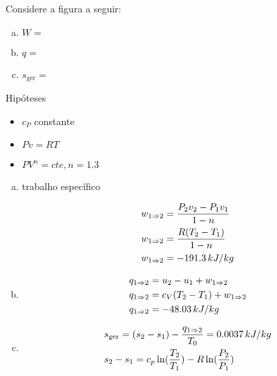 \begin{Exerc}[8.117 6\pa Ed.]
Considere a figura a seguir:


\begin{enumerate}[a)]
 \item $W =$
 \item $q =$
 \item $s_{\operatorname{ger}} =$
\end{enumerate}
\end{Exerc}

\begin{sol}
Hipóteses

\begin{itemize}
\item $c_{P}$ constante
\item $Pv = RT$
\item $PV^{n}=cte, n = 1.3$
\end{itemize}

\begin{enumerate}[a)]
 \item trabalho específico

\[
\begin{gathered}
  w_{1 \imp 2} = \frac{P_2 v_2 - P_1 v_1}{1-n} \hfill \\
  w_{1 \imp 2} = \frac{R(T_2 - T_1)}{1-n} \hfill \\
  w_{1 \imp 2} = -191.3\,kJ/kg \hfill \\
\end{gathered} 
\]

 \item

\[
\begin{gathered}
  q_{1 \imp 2} = u_2 - u_1 + w_{1 \imp 2} \hfill \\
  q_{1 \imp 2} = c_V (T_2 - T_1) + w_{1 \imp 2} \hfill \\ 
  q_{1 \imp 2} = -48.03\,kJ/kg \hfill \\ 
\end{gathered} 
\]

 \item

\[
\begin{gathered}
  s_{\operatorname{ger}} = (s_2 - s_1) - \frac{q _{1 \imp 2}}{T_0} = 0.0037\,kJ/kg \hfill \\
  s_2 - s_1 = c_p \ln(\frac{T_2}{T_1}) - R\ln(\frac{P_2}{P_1}) \hfill \\ 
\end{gathered} 
\]

\end{enumerate}
\end{sol}

